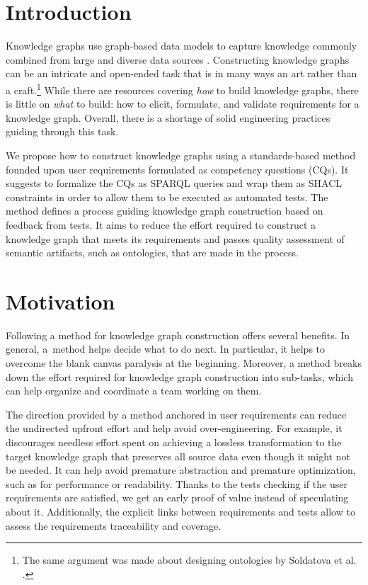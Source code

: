 \documentclass[
]{ceurart}
\begin{document}
\maketitle

\section{Introduction}
Knowledge graphs use graph-based data models to capture knowledge commonly combined from large and diverse data sources \cite{Hogan2021}. Constructing knowledge graphs can be an intricate and open-ended task that is in many ways an art rather than a craft.\footnote{The same argument was made about designing ontologies by Soldatova et al. \cite{Soldatova2016}.} While there are resources covering \textit{how} to build knowledge graphs, there is little on \textit{what} to build: how to elicit, formulate, and validate requirements for a knowledge graph. Overall, there is a shortage of solid engineering practices guiding through this task.

We propose how to construct knowledge graphs using a standards-based method founded upon user requirements formulated as competency questions (CQs). It suggests to formalize the CQs as SPARQL queries \cite{SPARQL2013} and wrap them as SHACL constraints \cite{SHACL2017} in order to allow them to be executed as automated tests. The method defines a process guiding knowledge graph construction based on feedback from tests. It aims to reduce the effort required to construct a knowledge graph that meets its requirements and passes quality assessment of semantic artifacts, such as ontologies, that are made in the process.

\section{Motivation}
Following a method for knowledge graph construction offers several benefits. In general, a~method helps decide what to do next. In particular, it helps to overcome the blank canvas paralysis at the beginning. Moreover, a method breaks down the effort required for knowledge graph construction into sub-tasks, which can help organize and coordinate a team working on them.

The direction provided by a method anchored in user requirements can reduce the undirected upfront effort and help avoid over-engineering. For example, it discourages needless effort spent on achieving a lossless transformation to the target knowledge graph that preserves all source data even though it might not be needed. It can help avoid premature abstraction and premature optimization, such as for performance or readability. Thanks to the tests checking if the user requirements are satisfied, we get an early proof of value instead of speculating about it. Additionally, the explicit links between requirements and tests allow to assess the requirements traceability and coverage.
\end{document}
